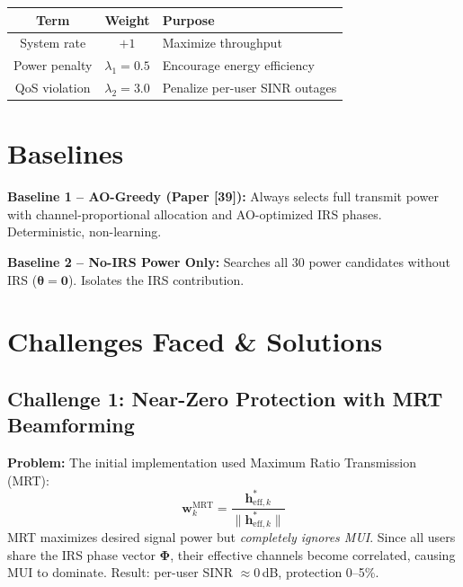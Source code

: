 \documentclass[11pt,a4paper]{article}
\begin{document}
\begin{table}[H]
\centering
\begin{tabular}{ccp{8cm}}
\toprule
\textbf{Term} & \textbf{Weight} & \textbf{Purpose} \\
\midrule
System rate & $+1$ & Maximize throughput \\
Power penalty & $\lambda_1 = 0.5$ & Encourage energy efficiency \\
QoS violation & $\lambda_2 = 3.0$ & Penalize per-user SINR outages \\
\bottomrule
\end{tabular}
\end{table}


\section{Baselines}

\textbf{Baseline 1 -- AO-Greedy (Paper [39]):} Always selects full transmit power with channel-proportional allocation and AO-optimized IRS phases. Deterministic, non-learning.

\textbf{Baseline 2 -- No-IRS Power Only:} Searches all 30 power candidates without IRS ($\boldsymbol{\theta} = \mathbf{0}$). Isolates the IRS contribution.


\section{Challenges Faced \& Solutions}

\subsection{Challenge 1: Near-Zero Protection with MRT Beamforming}

\textbf{Problem:} The initial implementation used Maximum Ratio Transmission (MRT):
\begin{equation}
\mathbf{w}_k^{\mathrm{MRT}} = \frac{\mathbf{h}_{\mathrm{eff},k}^*}{\|\mathbf{h}_{\mathrm{eff},k}^*\|}
\end{equation}
MRT maximizes desired signal power but \emph{completely ignores MUI}. Since all users share the IRS phase vector $\boldsymbol{\Phi}$, their effective channels become correlated, causing MUI to dominate. Result: per-user SINR $\approx 0$\,dB, protection 0--5\%.
\end{document}
